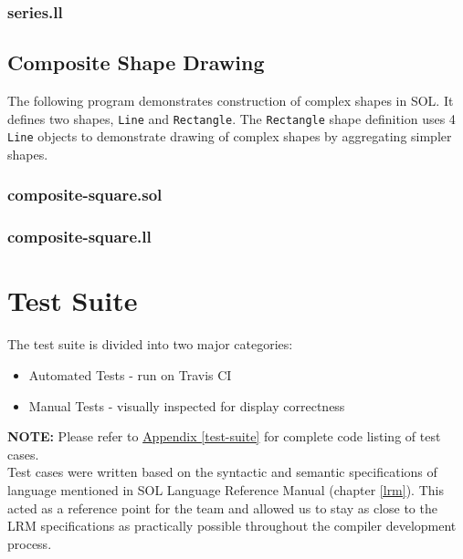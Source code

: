 \documentclass[letterpaper,12pt]{report}
\begin{document}
    \subsubsection{series.ll}
    

    \subsection{Composite Shape Drawing}
    The following program demonstrates construction of complex shapes in SOL. It defines two shapes, \texttt{Line} and \texttt{Rectangle}. The \texttt{Rectangle} shape definition uses 4 \texttt{Line} objects to demonstrate drawing of complex shapes by aggregating simpler shapes.

    \subsubsection{composite-square.sol}
    

    \subsubsection{composite-square.ll}
    

  \section{Test Suite}
    The test suite is divided into two major categories:
    \begin{itemize}
      \itemsep 0em
      \item Automated Tests - run on Travis CI
      \item Manual Tests - visually inspected for display correctness
    \end{itemize}

    \textbf{NOTE:} Please refer to \underline{Appendix \ref{test-suite}} for complete code listing of test cases.\\

    Test cases were written based on the syntactic and semantic specifications of language mentioned in SOL Language Reference Manual (chapter \ref{lrm}). This acted as a reference point for the team and allowed us to stay as close to the LRM specifications as practically possible throughout the compiler development process.\\
\end{document}
